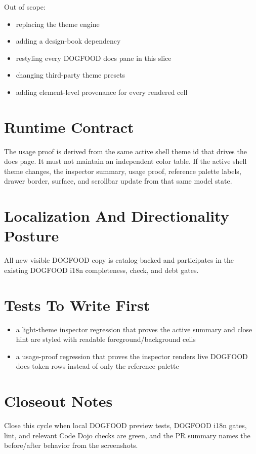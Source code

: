 Out of scope:

\begin{itemize}
\tightlist
\item
  replacing the theme engine
\item
  adding a design-book dependency
\item
  restyling every DOGFOOD docs pane in this slice
\item
  changing third-party theme presets
\item
  adding element-level provenance for every rendered cell
\end{itemize}

\section{Runtime Contract}\label{record-186-runtime-contract}

The usage proof is derived from the same active shell theme id that drives the docs page. It must not maintain an independent color table. If the active shell theme changes, the inspector summary, usage proof, reference palette labels, drawer border, surface, and scrollbar update from that same model state.

\section{Localization And Directionality Posture}\label{record-186-localization-and-directionality-posture}

All new visible DOGFOOD copy is catalog-backed and participates in the existing DOGFOOD i18n completeness, check, and debt gates.

\section{Tests To Write First}\label{record-186-tests-to-write-first}

\begin{itemize}
\tightlist
\item
  a light-theme inspector regression that proves the active summary and close hint are styled with readable foreground/background cells
\item
  a usage-proof regression that proves the inspector renders live DOGFOOD docs token rows instead of only the reference palette
\end{itemize}

\section{Closeout Notes}\label{record-186-closeout-notes}

Close this cycle when local DOGFOOD preview tests, DOGFOOD i18n gates, lint, and relevant Code Dojo checks are green, and the PR summary names the before/after behavior from the screenshots.

